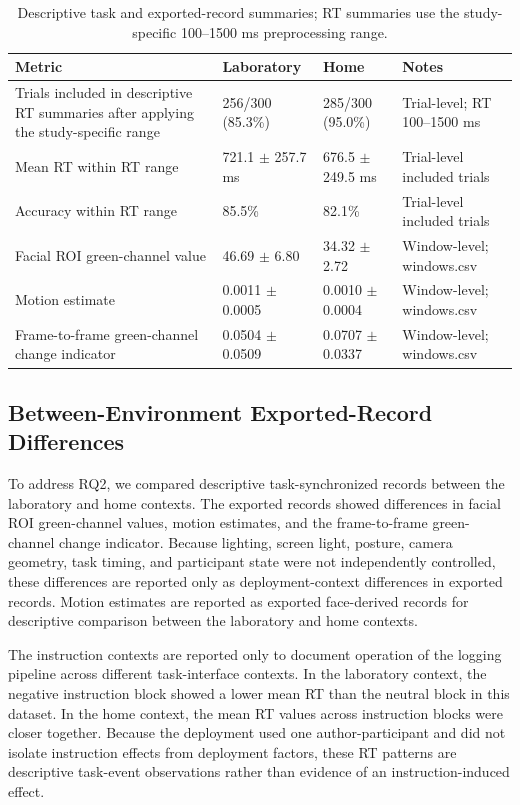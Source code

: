 \documentclass[dvipdfmx]{ehis}
\begin{document}
\begin{table}[t]
\centering
\caption{Descriptive task and exported-record summaries; RT summaries use the study-specific 100--1500 ms preprocessing range.}
\label{tab:data_quality}
\footnotesize
\begin{tabular}{@{}p{}p{}p{}p{}@{}}
\toprule
\textbf{Metric} & \textbf{Laboratory} & \textbf{Home} & \textbf{Notes} \\
\midrule
Trials included in descriptive RT summaries after applying the study-specific range & 256/300 (85.3\%) & 285/300 (95.0\%) & Trial-level; RT 100--1500 ms \\
Mean RT within RT range & 721.1 $\pm$ 257.7 ms & 676.5 $\pm$ 249.5 ms & Trial-level included trials \\
Accuracy within RT range & 85.5\% & 82.1\% & Trial-level included trials \\
Facial ROI green-channel value & 46.69 $\pm$ 6.80 & 34.32 $\pm$ 2.72 & Window-level; windows.csv \\
Motion estimate & 0.0011 $\pm$ 0.0005 & 0.0010 $\pm$ 0.0004 & Window-level; windows.csv \\
Frame-to-frame green-channel change indicator & 0.0504 $\pm$ 0.0509 & 0.0707 $\pm$ 0.0337 & Window-level; windows.csv \\
\bottomrule
\end{tabular}
\end{table}

\subsection{Between-Environment Exported-Record Differences}
To address RQ2, we compared descriptive task-synchronized records between the laboratory and home contexts.
The exported records showed differences in facial ROI green-channel values, motion estimates, and the frame-to-frame green-channel change indicator.
Because lighting, screen light, posture, camera geometry, task timing, and participant state were not independently controlled, these differences are reported only as deployment-context differences in exported records.
Motion estimates are reported as exported face-derived records for descriptive comparison between the laboratory and home contexts.

The instruction contexts are reported only to document operation of the logging pipeline across different task-interface contexts.
In the laboratory context, the negative instruction block showed a lower mean RT than the neutral block in this dataset.
In the home context, the mean RT values across instruction blocks were closer together.
Because the deployment used one author-participant and did not isolate instruction effects from deployment factors, these RT patterns are descriptive task-event observations rather than evidence of an instruction-induced effect.
\end{document}
